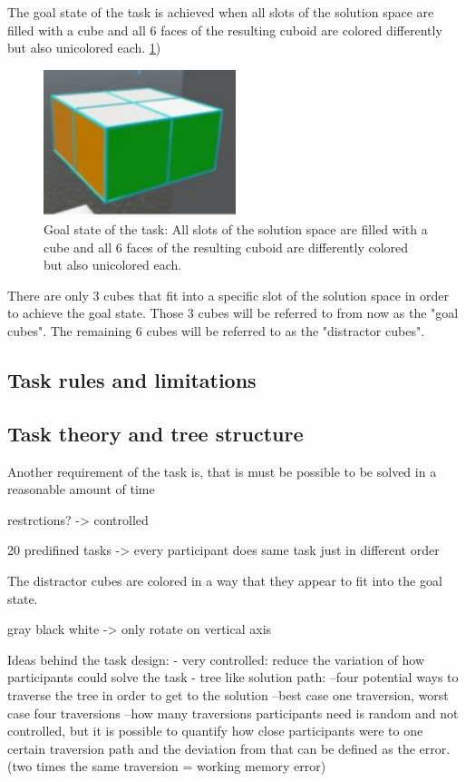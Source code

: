 \documentclass{article}
\begin{document}
The goal state of the task is achieved when all slots of the solution space are filled with a cube and all 6 faces of the resulting cuboid are colored differently but also unicolored each. \ref{fig:vr_task_goalstate})

\begin{figure}[h]
\centering
\includegraphics[width=0.5\textwidth]{vr_task_goalstate}
\caption{Goal state of the task: All slots of the solution space are filled with a cube and all 6 faces of the resulting cuboid are differently colored but also unicolored each. }
\label{fig:vr_task_goalstate}
\end{figure}

There are only 3 cubes that fit into a specific slot of the solution space in order to achieve the goal state. Those 3 cubes will be referred to from now as the "goal cubes". The remaining 6 cubes will be referred to as the "distractor cubes".

\subsection{Task rules and limitations}


\subsection{Task theory and tree structure}
Another requirement of the task is, that is must be possible to be solved in a reasonable amount of time 

restrctions? -> controlled

20 predifined tasks -> every participant does same task just in different order

The distractor cubes are colored in a way that they appear to fit into the goal state.

gray black white -> only rotate on vertical axis

Ideas behind the task design:	
- very controlled: reduce the variation of how participants could solve the task
- tree like solution path: 
--four potential ways to traverse the tree in order to get to the solution
--best case one traversion, worst case four traversions
--how many traversions participants need is random and not controlled, but it is possible to quantify how close participants were to one certain traversion path and the deviation from that can be defined as the error. (two times the same traversion = working memory error)
\end{document}
